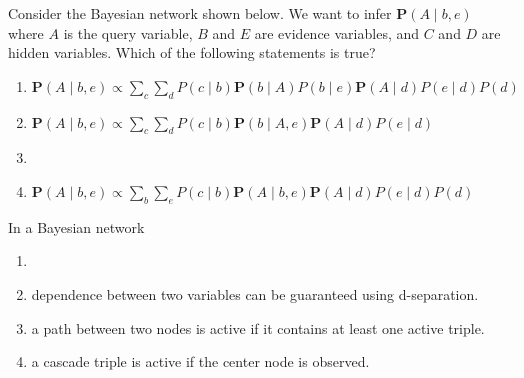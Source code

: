 \documentclass[11pt, a4paper]{exam}
\begin{document}
\begin{quiz}
    \item Consider the Bayesian network shown below. We want to infer $\mathbf{P}(A \mid b, e)$ where $A$ is the query variable, $B$ and $E$ are evidence variables, and $C$ and $D$ are hidden variables. Which of the following statements is true?
    \begin{center}
    \end{center}
    \begin{enumerate}[label=$\bigcirc$]
        \item $\mathbf{P}(A \mid b, e) \propto \sum_c \sum_d P(c \mid b) \mathbf{P}(b \mid A) P(b \mid e) \mathbf{P}(A \mid d) P(e \mid d) P(d)$
        \item $\mathbf{P}(A \mid b, e) \propto \sum_c \sum_d P(c \mid b) \mathbf{P}(b \mid A, e) \mathbf{P}(A \mid d) P(e \mid d)$
        \item {}
        \item $\mathbf{P}(A \mid b, e) \propto \sum_b \sum_e P(c \mid b) \mathbf{P}(A \mid b, e) \mathbf{P}(A \mid d) P(e \mid d) P(d)$
    \end{enumerate}

    \item In a Bayesian network
    \begin{enumerate}[label=$\bigcirc$]
        \item {}
        \item dependence between two variables can be guaranteed using d-separation.
        \item a path between two nodes is active if it contains at least one active triple.
        \item a cascade triple is active if the center node is observed.
    \end{enumerate}


\end{quiz}
\end{document}
